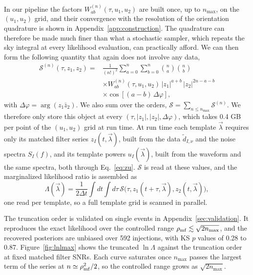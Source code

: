 \documentclass[aps,prd,twocolumn,superscriptaddress,nofootinbib]{revtex4-2}
\begin{document}
In our pipeline the factors $W^{(n)}_{ab}(\tau, u_1, u_2)$ are
built once, up to $n_{\max}$, on the $(u_1, u_2)$ grid, and
their convergence with the resolution of the orientation
quadrature is shown in Appendix~\ref{app:construction}. The
quadrature can therefore be made much finer than what a
stochastic sampler, which repeats the sky integral at every
likelihood evaluation, can practically afford. We can then form
the following quantity that again does not involve any data,
\begin{equation}
\begin{aligned}
\mathcal{S}^{(n)}(\tau, z_1, z_2) = {} & \frac{1}{(n!)^2}
\sum_{a=0}^{n} \sum_{b=0}^{n} \binom{n}{a} \binom{n}{b} \\
& \times W^{(n)}_{ab}(\tau, u_1, u_2)\,
|z_1|^{a+b}\, |z_2|^{2n-a-b} \\
& \times \cos[(a-b)\, \Delta\varphi],
\end{aligned}
\label{eq:kernelS}
\end{equation}
with $\Delta\varphi = \arg( z_1 \bar z_2 )$. We also sum over
the orders,
$\mathcal{S} = \sum_{n \le n_{\max}} \mathcal{S}^{(n)}$. We
therefore only store this object at every
$(\tau, |z_1|, |z_2|, \Delta\varphi)$, which takes 0.4 GB per
point of the $(u_1, u_2)$ grid at run time. At run time each template $\vec\lambda$
requires only its matched filter series $z_I(t, \vec\lambda)$, built
from the data $\tilde d_{I,\nu}$ and the noise spectra $S_I(f)$, and
its template powers $u_I(\vec\lambda)$, built from the waveform and
the same spectra, both through Eq.~\eqref{eq:zu}. $\mathcal{S}$ is read at these
values, and the marginalized likelihood ratio is
assembled as
\begin{equation}
\Lambda(\vec\lambda) = \frac{1}{2\Delta t} \int dt \int d\tau\,
\mathcal{S}\big(\tau, z_1(t + \tau, \vec\lambda),
z_2(t, \vec\lambda)\big),
\label{eq:read}
\end{equation}
one read per template, so a full template grid is scanned in
parallel.

The truncation order is validated on single events in Appendix~\ref{sec:validation}. It reproduces the exact likelihood over the controlled range $\rho_{\rm mf} \lesssim \sqrt{2 n_{\max}}$, and the recovered posteriors are unbiased over 592 injections, with KS $p$ values of 0.28 to 0.87. Figure~\ref{fig:lnlmax} shows the truncated $\ln \Lambda$ against the truncation order at fixed matched filter SNRs. Each curve saturates once $n_{\max}$ passes the largest term of the series at $n \simeq \rho_{\rm mf}^2 / 2$, so the controlled range grows as $\sqrt{2 n_{\max}}$.
\end{document}
